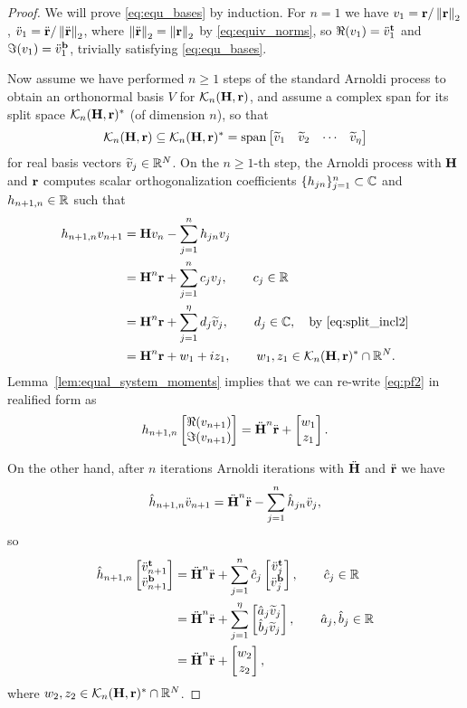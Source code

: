 \medskip
\begin{proof}
We will prove \eqref{eq:equ_bases} by induction.
For $n=1$ we have $v_1 = \textbf{\textup{r}}/\left\| \textbf{\textup{r}} \right\|_{2}$, $\ddot{v}_1 = \ddot{\textbf{\textup{r}}} / \left\| \ddot{\textbf{\textup{r}}} \right\|_{2}$, where $\left\| \ddot{\textbf{\textup{r}}} \right\|_{2}=\left\| \textbf{\textup{r}} \right\|_{2}$ by  \eqref{eq:equiv_norms}, so $\Re(v_1) = \ddot{v}^{\mathrm{\bf{t}}}_{1}$ and
$\Im(v_1) = \ddot{v}^{\mathrm{\bf{b}}}_{1}$, trivially satisfying \eqref{eq:equ_bases}.
   
Now assume we have performed $n\geq 1$ steps of the standard Arnoldi process to obtain an orthonormal basis $V$ for $\mathcal{K}_{n}({\textbf{\textup{H}}},{\textbf{\textup{r}}})$, and assume a complex span for its split space $\mathcal{K}_{n}({\textbf{\textup{H}}},{\textbf{\textup{r}}})^*$ (of dimension $n$), so that 
\begin{equation}
\krylov{n}{\H}{\Rr} \subseteq \krylov{n}{\H}{\Rr}^*=\spn\mat{\vt_1 & \vt_2&\cdots&\vt_\nsplit}
\label{eq:split_incl2}
\end{equation}
for real basis vectors $\widetilde{v}_j\in\mathbb{R}^N$.
On the $n\geq 1$-th step,  the Arnoldi process with $\textbf{\textup{H}}$ and $\textbf{\textup{r}}$ computes scalar orthogonalization coefficients $\{h_{jn}\}_{j=1}^n\subset\mathbb{C}$  and $h_{n+1,n}\in\mathbb{R}$ such that 
	\begin{align}
	h_{n+1,n}v_{n+1} &= \H v_{n} - \sum_{j=1}^{n} h_{jn} v_j \nonumber\\
	 &= \H^{n}\Rr + \sum_{j=1}^{n} c_j v_j, \qquad  c_j\in\R \nonumber\\
	 &= \H^{n}\Rr + \sum_{j=1}^{\nsplit} d_j\vt_j, \qquad d_j\in\C,\quad \text{by \eqref{eq:split_incl2}} \nonumber\\
	 &= \H^{n}\Rr + w_1 + iz_1, \qquad w_1,z_1\in\krylov{n}{\H}{\Rr}^* \cap \R^N.
\label{eq:pf2}
	\end{align}
Lemma~\ref{lem:equal_system_moments} implies that we can re-write \eqref{eq:pf2} in realified form as
\begin{equation}
h_{n+1,n}\mat{\Re(v_{n+1})\\ \Im(v_{n+1})} = \Heq^{n}\req + \mat{w_1\\z_1}.
\label{eq:cplx_prog}
\end{equation}

On the other hand, after $n$ iterations Arnoldi iterations with ${\ddot{\textbf{\textup{H}}}}$ and $\ddot{\textbf{\textup{r}}}$ we have
\[
\hat{h}_{n+1,n}\ddot{v}_{n+1} = {\ddot{\textbf{\textup{H}}}}^{n}\ddot{\textbf{\textup{r}}} - \sum_{j=1}^{n} \hat{h}_{jn}\ddot{v}_j,
\]
so
\begin{align*}
\heq_{n+1,n}\mat{\tp{\veq}{n+1}\\ \bt{\veq}{n+1}}
 &= \Heq^{n}\req + \sum_{j=1}^{n} \hat{c}_j\mat{\tp{\veq}{j}\\\bt{\veq}{j}}, \qquad \hat{c}_j\in\R  \\
&= \Heq^{n}\req + \sum_{j=1}^{\nsplit} \mat{\hat{a}_j\vt_j \\ \hat{b}_j\vt_j},
\qquad \hat{a}_j,\hat{b}_j \in\R\\
&= \Heq^{n}\req + \mat{w_2 \\ z_2},
\label{eq:eqreal_prog}
\end{align*}
where $w_2,z_2\in\mathcal{K}_{n}({\textbf{\textup{H}}},{\textbf{\textup{r}}})^* \cap \mathbb{R}^N$.
\end{proof}


